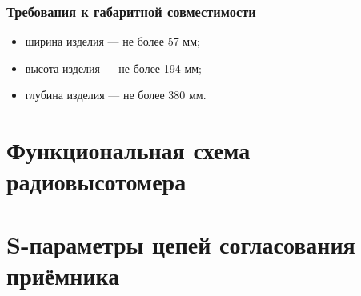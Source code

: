 \documentclass[utf8x, 14pt, oneside, a4paper]{article}
\begin{document}
			\subsubsection*{Требования к габаритной совместимости}
			\begin{itemize}
				\item ширина изделия --- не более 57 мм;
				\item высота изделия --- не более 194 мм;
				\item глубина изделия --- не более 380 мм.
			\end{itemize}
	
	\pagebreak
	
	\section{Функциональная схема радиовысотомера}\label{app:functional_schem}
	\pagebreak
	
	\pagebreak
	
	
	\section{S-параметры цепей согласования приёмника}\label{app:receiver_touchstone}
	\pagebreak
	
\end{document}
